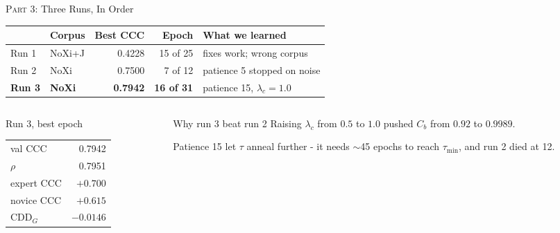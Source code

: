 \documentclass[aspectratio=169]{beamer}
\begin{document}
	\begin{frame}{\textsc{Part 3:} Three Runs, In Order}
		\begin{center}
			\small
			\begin{tabular}{llrrl}
				& \textbf{Corpus} & \textbf{Best CCC} & \textbf{Epoch} & \textbf{What we learned} \\
				\hline
				Run 1 & NoXi+J & 0.4228 & 15 of 25 & fixes work; wrong corpus \\
				Run 2 & NoXi & 0.7500 & 7 of 12 & patience 5 stopped on noise \\
				\textbf{Run 3} & \textbf{NoXi} & \textbf{0.7942} & \textbf{16 of 31} & patience 15, $\lambda_c = 1.0$ \\
			\end{tabular}
		\end{center}
		\vspace{0.5em}
		\begin{columns}[onlytextwidth]
			\begin{column}{0.48\textwidth}
				\begin{block}{Run 3, best epoch}
					\small
					\begin{tabular}{lr}
						val CCC & 0.7942 \\
						$\rho$ & 0.7951 \\
						expert CCC & $+0.700$ \\
						novice CCC & $+0.615$ \\
						$\text{CDD}_G$ & $-0.0146$ \\
					\end{tabular}
				\end{block}
			\end{column}
			\begin{column}{0.48\textwidth}
				\begin{block}{Why run 3 beat run 2}
					\small
					Raising $\lambda_c$ from $0.5$ to $1.0$ pushed $C_b$ from $0.92$ to $0.9989$.
					\vspace{0.2em}

					Patience 15 let $\tau$ anneal further - it needs $\sim$45 epochs to reach
					$\tau_{\min}$, and run 2 died at 12.
				\end{block}
			\end{column}
		\end{columns}
	\end{frame}
\end{document}
